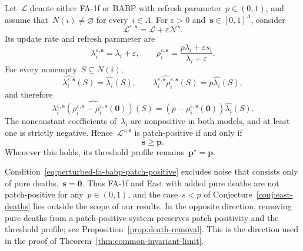 \documentclass[EJP,preprint,NODS,nobera]{ejpecp}
\newcommand{\bb}[1]{\left(#1\right)}
\newcommand{\vn}{\varnothing}
\newcommand{\mb}[1]{\mathbf{#1}}
\newcommand{\Lcal}{\mathcal{L}}
\newcommand{\Ncal}{\mathcal{N}}
\begin{document}
\begin{example}
\label{ex:pp-noisy}
Let~$\Lcal$ denote either FA-1f or BABP with refresh parameter~$p\in(0,1)$,
and assume that~$N(i)\neq\vn$ for every~$i\in\Lambda$. For
$\varepsilon>0$ and~$\mb s\in[0,1]^\Lambda$, consider
\begin{equation*}
\Lcal^{\varepsilon,\mb s}
=
\Lcal+\varepsilon\Ncal^{\mb s}.
\end{equation*}
Its update rate and refresh parameter are
\begin{equation*}
\lambda_i^{\varepsilon,\mb s}
=
\lambda_i+\varepsilon,
\qquad
\rho_i^{\varepsilon,\mb s}
=
\frac{p\lambda_i+\varepsilon s_i}
{\lambda_i+\varepsilon}.
\end{equation*}
For every nonempty~$S\subseteq N(i)$,
\begin{equation*}
\widehat{\lambda_i^{\varepsilon,\mb s}}(S)
=
\widehat{\lambda_i}(S),
\qquad
\widehat{\lambda_i^{\varepsilon,\mb s}
\rho_i^{\varepsilon,\mb s}}(S)
=
p\widehat{\lambda_i}(S),
\end{equation*}
and therefore
\begin{equation*}
\widehat{\lambda_i^{\varepsilon,\mb s}
\bb{\rho_i^{\varepsilon,\mb s}
-\rho_i^{\varepsilon,\mb s}(\mb0)}}(S)
=
\bb{p-\rho_i^{\varepsilon,\mb s}(\mb0)}
\widehat{\lambda_i}(S).
\end{equation*}
The nonconstant coefficients of~$\lambda_i$ are nonpositive in both models,
and at least one is strictly negative. Hence~$\Lcal^{\varepsilon,\mb s}$ is
patch-positive if and only if
\begin{equation}
\label{eq:perturbed-fa-babp-patch-positive}
\mb s\geq\mb p.
\end{equation}
Whenever this holds, its threshold profile remains~$\mb p^\star=\mb p$.
\end{example}

\begin{remark}
\label{rem:pure-deaths-not-patch-positive}
Condition~\eqref{eq:perturbed-fa-babp-patch-positive} excludes noise that
consists only of pure deaths,~$\mb s=\mb 0$. Thus FA-1f and East with added
pure deaths are not patch-positive for any~$p\in(0,1)$, and the
case~$s<p$ of Conjecture~\ref{conj:east-deaths} lies outside the scope of our
results. In the opposite
direction, removing pure deaths from a patch-positive system preserves patch
positivity and the threshold profile; see
Proposition~\ref{prop:death-removal}. This is the direction used in the
proof of Theorem~\ref{thm:common-invariant-limit}.
\end{remark}
\end{document}
